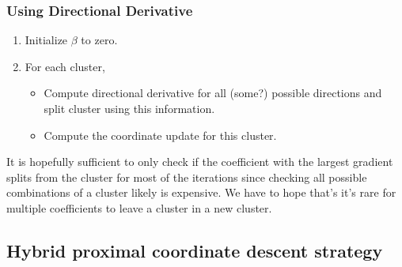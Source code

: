 \subsubsection{Using Directional Derivative}

\begin{enumerate}
  \item Initialize \(\beta\) to zero.
  \item For each cluster,
        \begin{itemize}
          \item Compute directional derivative for all (some?) possible 
                directions and split cluster using this information.
          \item Compute the coordinate update for this cluster.
        \end{itemize}
\end{enumerate}

It is hopefully sufficient to only check if the coefficient with the
largest gradient splits from the cluster for most of the iterations since
checking all possible combinations of a cluster likely is expensive.
We have
to hope that's it's rare for multiple coefficients to leave a cluster in
a new cluster.

\subsection{Hybrid proximal coordinate descent strategy}

\begin{algorithm}[tb]
  \caption{\texttt{Hybrid slopecd} (proposed)}\label{alg:sksparse}
\Return{$\beta$}
\end{algorithm}